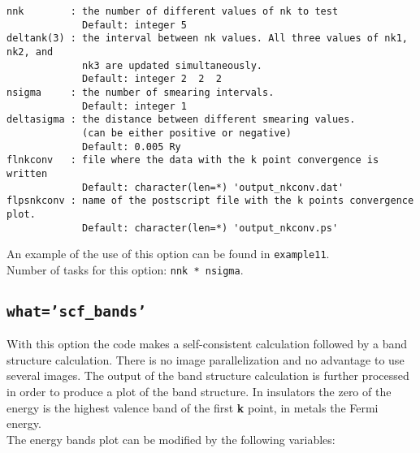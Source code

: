 \documentclass[12pt,a4paper]{article}
\begin{document}
\begin{verbatim}
nnk        : the number of different values of nk to test
             Default: integer 5
deltank(3) : the interval between nk values. All three values of nk1, nk2, and
             nk3 are updated simultaneously.
             Default: integer 2  2  2
nsigma     : the number of smearing intervals.
             Default: integer 1 
deltasigma : the distance between different smearing values.
             (can be either positive or negative)
             Default: 0.005 Ry
flnkconv   : file where the data with the k point convergence is written
             Default: character(len=*) 'output_nkconv.dat'
flpsnkconv : name of the postscript file with the k points convergence plot.
             Default: character(len=*) 'output_nkconv.ps'
\end{verbatim}
An example of the use of this option can be found in \texttt{example11}. \\
Number of tasks for this option: \texttt{nnk * nsigma}.

\subsection{\color{web-blue}\texttt{what='scf\_bands'}}
With this option the code makes a self-consistent calculation followed 
by a band structure calculation. There is no image parallelization and no
advantage to use several images. The output of the band structure 
calculation is further processed in order to produce a plot of the band 
structure.
In insulators the zero of the energy is the highest valence band 
of the first {\bf k} point, in metals the Fermi energy. \\
The energy bands plot can be modified by the following variables:
\end{document}
